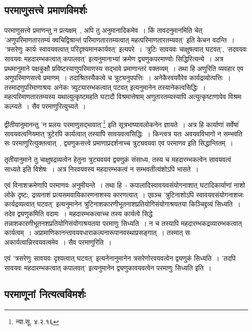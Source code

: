 		\subsection{परमाणुसत्त्वे प्रमाणविमर्शः}

		परमाणुसत्त्वे प्रमाणन्तु न प्रत्यक्षम्~, अपि तु अनुमानादिकमेव~। किं तावदनुमानमिति चेत् 'अणुपरिमाणतारतम्यं‌ क्वचिद्विश्रान्तं परिमाणतारतम्यत्वात् महत्परिमाणतारतम्यवत्' इति केचन वदन्ति~। 'त्रसरेणुः कार्यः स्वावयवत्वात् परिदृश्यमानकार्यवत्' इत्यपरे~। 'त्रुटिः सावयवः चाक्षुषत्वात् घटवत्', 'तदवयवः सावयवः महदारम्भकत्वात् कपालवत्' इत्यनुमानाभ्यां क्रमेण द्व्यणुकपरमाण्वोः सिद्धिरित्यन्ये~। अत्र प्रथमानुमाने पक्षकुक्षौ प्रविष्टस्याणुपरिमाणस्य सद्भावे प्रमाणान्तरं वक्तव्यम्~। तथा हि अणुरिति व्यवहार एव अणुपरिमाणसत्त्वे प्रमाणम्~। तदाश्रितस्यैकत्वे च त्रुट्यनुपपत्तिः~। अनेकैरवयवैरेव कार्यद्रव्योत्पत्तिः~। तस्मादणुपरिमाणाश्रयः अनेकः त्र्युट्यारम्भकत्वात् पटवत् इत्यनुमानेन तस्यानेकत्वसिद्धिः~। महत्परिमाणतारतम्यस्य यथात्युत्कृष्टमहति घटादौ विश्रमात्तेषाम् अणुतारतम्यस्यापि अत्युत्कृष्टाणावेव विश्रमः कल्प्यते~। सैव परमाणुरित्युच्यते~।

		द्वीतीयानुमानन्तु 'न प्रलयः परमाणुसद्भावात्'\footnote{न्या.सू. ४.२.१६} इति सूत्रभाष्यावलोकनेन ज्ञायते~। अत्र हि कार्याणां सर्वेषां सावयवत्वनियमात् त्रुटेरपि कार्यत्वात् तस्यापि सावयवत्वसिद्धिः~। किन्त्वत्र यतः अवयवविभागो न सम्भवति सः परमाणुरित्युक्तत्वात्~, द्व्यणुकसत्त्वे प्रमाणाप्रदर्शनाच्च त्रुट्यवयवा एव परमाणव इति सिद्धान्तितम्~।

		तृतीयानुमाने तु चाक्षुषद्रव्यत्वेन हेतुना त्रुट्यवयवं द्व्यणुकं संसाध्य, तस्य च महदारम्भकत्वेन सावयवत्वं साध्यते इति विशेषः~। अत्र निरवयवस्य महदारम्भकत्वं न सम्भवतीत्यंशोऽपि भासते~।

		एवं विनाशक्रमेणापि परमाणवः अनुमीयन्ते~। तथा हि~- कपालादिस्वावयवसंयोगनाशात् घटादिकार्याणां नाशो लोके दृष्टः, द्रव्यनाशं प्रत्यसमवायिकारणनाशस्य कारणत्वात्~। एवञ्च 'त्रुटिनाशोऽपि स्वावयवसंयोगनाशजः कार्यद्रव्यत्वात् घटवत्' इत्यनुमानेन त्रुटिनाशकारणीभूतनाशप्रतियोगिसंयोगाश्रयतया किञ्चिद्द्रव्यं सिध्यति~। तदेव द्व्यणुकमिति वदामः~। महदारम्भकत्वाच्च तस्य कार्यत्वे सिद्धे तन्नाशकारणीभूतनशप्रतियोगिसंयोगाश्रयतया परमाणुः सिध्यति~। न च तस्यापि महदारम्भकद्रव्यारम्भकत्वात् कार्यत्वम्~। अप्रामाणिकानन्तावयवधाराकल्पनारूपानवस्थाप्रसङ्गात्~। तस्मात् सः अकार्यत्वान्निरवयवत्वमेव~। सैव परमाणुरिति~।

		एवं 'त्रसरेणुः सावयवः दृश्यत्वात् घटवत्' इत्यनेनानुमानेन त्रसरेणोरवयवत्वेन द्व्यणुकं सिध्यति~। 'तदपि सावयवः महदारम्भकत्वात् कपालवत्' इत्यनुमानेन द्व्यणुकावयवत्वेन परमाणुः सिध्यति इति~। 

		\subsection{परमाणूनां नित्यत्वविमर्शः}

